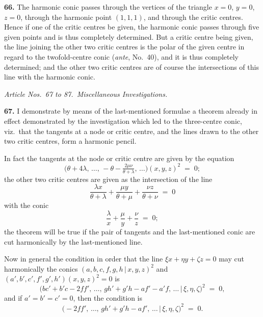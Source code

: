 \documentclass[11pt,a4paper]{article}
\providecommand{\mid}{\,|\,}
\begin{document}
\medskip

\textbf{66.} The harmonic conic passes through the vertices of the triangle $x=0$, $y=0$, $z=0$, through the harmonic point $(1,1,1)$, and through the critic centres. Hence if one of the critic centres be given, the harmonic conic passes through five given points and is thus completely determined. But a critic centre being given, the line joining the other two critic centres is the polar of the given centre in regard to the twofold-centre conic (\emph{ante}, No.~40), and it is thus completely determined; and the other two critic centres are of course the intersections of this line with the harmonic conic.

\medskip

\noindent\textit{Article Nos.\ 67 to 87.\ Miscellaneous Investigations.}

\medskip

\textbf{67.} I demonstrate by means of the last-mentioned formulae a theorem already in effect demonstrated by the investigation which led to the three-centre conic, viz.\ that the tangents at a node or critic centre, and the lines drawn to the other two critic centres, form a harmonic pencil.

\smallskip

In fact the tangents at the node or critic centre are given by the equation
\[
\bigl(\theta+4\lambda,\,\ldots,\,-\theta-\tfrac{2\mu\nu}{\theta+\lambda},\,\ldots\bigr)(x,y,z)^{2} \;=\; 0;
\]
the other two critic centres are given as the intersection of the line
\[
\frac{\lambda x}{\theta+\lambda}+\frac{\mu y}{\theta+\mu}+\frac{\nu z}{\theta+\nu} \;=\; 0
\]
with the conic
\[
\frac{\lambda}{x}+\frac{\mu}{y}+\frac{\nu}{z} \;=\; 0;
\]
the theorem will be true if the pair of tangents and the last-mentioned conic are cut harmonically by the last-mentioned line.

\smallskip

Now in general the condition in order that the line $\xi x + \eta y + \zeta z = 0$ may cut harmonically the conics $(a,b,c,f,g,h\mid x,y,z)^{2}$ and $(a',b',c',f',g',h')(x,y,z)^{2} = 0$ is
\[
\bigl(b c' + b' c - 2 f f',\,\ldots,\,g h' + g' h - a f' - a' f,\,\ldots\mid \xi,\eta,\zeta\bigr)^{2} \;=\; 0,
\]
and if $a' = b' = c' = 0$, then the condition is
\[
\bigl(-2 f f',\,\ldots,\,g h' + g' h - a f',\,\ldots \mid \xi,\eta,\zeta\bigr)^{2} \;=\; 0.
\]
\end{document}
